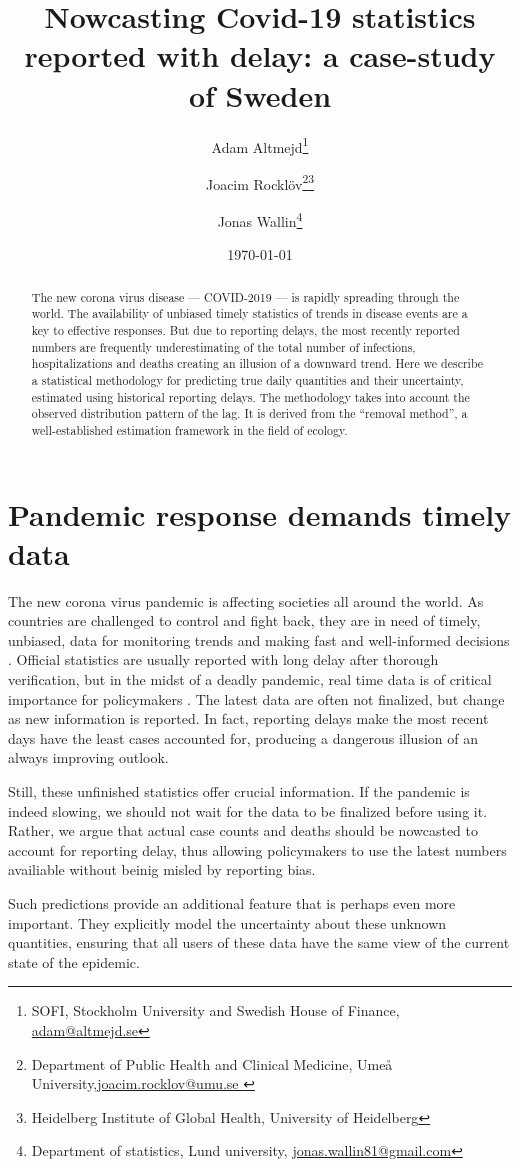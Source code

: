 \documentclass[a4paper,11pth]{article}
\title{Nowcasting Covid-19 statistics reported with delay: a case-study of Sweden}
\date{\today}
\author{
	Adam Altmejd\thanks{SOFI, Stockholm University and Swedish House of Finance, \href{mailto:adam@altmejd.se}{adam@altmejd.se}} \and
	Joacim Rocklöv\thanks{Department of Public Health and Clinical Medicine, Umeå University,\href{mailto:joacim.rocklov@umu.se}{joacim.rocklov@umu.se }}\thanks{Heidelberg Institute of Global Health, University of Heidelberg}  \and
	Jonas Wallin\thanks{Department of statistics, Lund university, \href{mailto:jonas.wallin81@gmail.com}{jonas.wallin81@gmail.com}}
}
\begin{document}
    \maketitle
    \begin{abstract}
        The new corona virus disease --- COVID-2019 --- is rapidly spreading through the world. The availability of unbiased timely statistics of trends in disease events are a key to effective responses. But due to reporting delays, the most recently reported numbers are frequently underestimating of the total number of infections, hospitalizations and deaths creating an illusion of a downward trend. Here we describe a statistical methodology for predicting true daily quantities and their uncertainty, estimated using historical reporting delays. The methodology takes into account the observed distribution pattern of the lag. It is derived from the ``removal method'', a well-established estimation framework in the field of ecology.
	\end{abstract}
\section{Pandemic response demands timely data}
The new corona virus pandemic is affecting societies all around the world. As countries are challenged to control and fight back, they are in need of timely, unbiased, data for monitoring trends and making fast and well-informed decisions \citep{No_author_2020_coronavirus_three}. Official statistics are usually reported with long delay after thorough verification, but in the midst of a deadly pandemic, real time data is of critical importance for policymakers \citep{Jajosky2004_evaluation_reporting}. The latest data are often not finalized, but change as new information is reported. In fact, reporting delays make the most recent days have the least cases accounted for, producing a dangerous illusion of an always improving outlook.

Still, these unfinished statistics offer crucial information. If the pandemic is indeed slowing, we should not wait for the data to be finalized before using it. Rather, we argue that actual case counts and deaths should be nowcasted to account for reporting delay, thus allowing policymakers to use the latest numbers availiable without beinig misled by reporting bias.

Such predictions provide an additional feature that is perhaps even more important. They explicitly model the uncertainty about these unknown quantities, ensuring that all users of these data have the same view of the current state of the epidemic.
\end{document}
